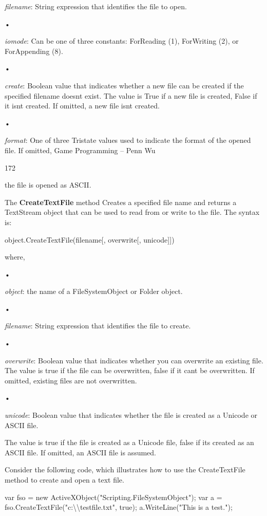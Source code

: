 \documentclass[
]{article}
\begin{document}
\emph{filename}: String expression that identifies the file to open.

•

\emph{iomode}: Can be one of three constants: ForReading (1), ForWriting
(2), or ForAppending (8).

•

\emph{create}: Boolean value that indicates whether a new file can be
created if the specified filename doesn\textquotesingle t exist. The
value is True if a new file is created, False if it
isn\textquotesingle t created. If omitted, a new file
isn\textquotesingle t created.

•

\emph{format}: One of three Tristate values used to indicate the format
of the opened file. If omitted, Game Programming -- Penn Wu

172

\protect\hypertarget{index_split_011.htmlux5cux23p173}{}{}the file is
opened as ASCII.

The \textbf{CreateTextFile} method Creates a specified file name and
returns a TextStream object that can be used to read from or write to
the file. The syntax is:

object.CreateTextFile(filename{[}, overwrite{[}, unicode{]}{]})

where,

•

\emph{object}: the name of a FileSystemObject or Folder object.

•

\emph{filename}: String expression that identifies the file to create.

•

\emph{overwrite}: Boolean value that indicates whether you can overwrite
an existing file. The value is true if the file can be overwritten,
false if it can\textquotesingle t be overwritten. If omitted, existing
files are not overwritten.

•

\emph{unicode}: Boolean value that indicates whether the file is created
as a Unicode or ASCII file.

The value is true if the file is created as a Unicode file, false if
it\textquotesingle s created as an ASCII file. If omitted, an ASCII file
is assumed.

Consider the following code, which illustrates how to use the
CreateTextFile method to create and open a text file.

var fso = new ActiveXObject("Scripting.FileSystemObject"); var a =
fso.CreateTextFile("c:\textbackslash\textbackslash testfile.txt", true);
a.WriteLine("This is a test.");
\end{document}

